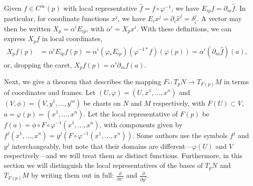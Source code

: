 Given $f\in C^{\infty}(p)$ with local representative $\hat f = f\circ \varphi^{-1}$, we have $E_{ip}f = \partial_{ia}\hat f$. In particular, for coordinate functions $x^j$, we have $E_i x^j = \partial_i \hat x^j = \delta_{i}^j$. A vector may then be written $X_p = \alpha^i E_{ip}$, with $\alpha^i = X_p x^i$. 
With these definitions, we can express $X_pf$ in local coordinates, 
\begin{equation}
\begin{aligned}
X_pf(p) & = {} \alpha^i E_{ip}f(p) = {} \alpha^i (\varphi_* E_{ip})(\varphi^{-1*}f)(\varphi(p)) = {} \alpha^i \left(\partial_{ia}\hat f\right)(a),%
\end{aligned}
\end{equation}
or, dropping the caret, $X_p f(p) = \alpha^i\partial_{ia} f(a)$. 

Next, we give a theorem that describes the mapping $F_*:T_pN \rightarrow T_{F(p)}M$ in terms of coordinates and frames.  %
Let $(U, \varphi) = (U, x^1, \dots, x^n)$ and $(V, \phi) = (V, y^1, \dots, y^m)$ be charts on $N$ and $M$ respectively, with $F(U)\subset V$, $a = \varphi(p) = (x^1, \dots, x^n)$. Let the local representative of $F(p)$ be $f(a) = \phi \circ F \circ \varphi^{-1}(x^1, \dots, x^n)$, with components given by $f^j(x^1, \dots, x^n) = y^j(F\circ \varphi^{-1}(x^1, \dots, x^n))$. Some authors use the symbols $f^j$ and $y^j$ interchangeably, but note that their domains are different---$\varphi(U)$ and $V$ respectively---and we will treat them as distinct functions. 
Furthermore, in this section we will distinguish the local representatives of the bases of $T_pN$ and $T_{F(p)}M$ by writing them out in full: $\frac{\partial}{\partial x^i}$ and $\frac{\partial}{\partial y^j}$. 

